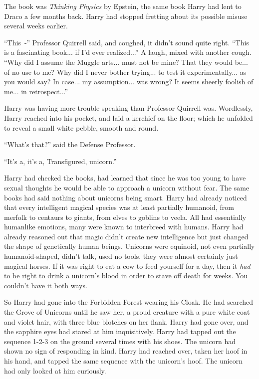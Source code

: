 The book was \emph{Thinking Physics} by Epstein, the same book Harry had lent to Draco a few months back. Harry had stopped fretting about its possible misuse several weeks earlier.

``This~-'' Professor Quirrell said, and coughed, it didn't sound quite right. ``This is a fascinating book... if I'd ever realized...'' A laugh, mixed with another cough. ``Why did I assume the Muggle arts... must not be mine? That they would be... of no use to me? Why did I never bother trying... to test it experimentally... as you would say? In case... my assumption... was wrong? It seems sheerly foolish of me... in retrospect...''

Harry was having more trouble speaking than Professor Quirrell was. Wordlessly, Harry reached into his pocket, and laid a kerchief on the floor; which he unfolded to reveal a small white pebble, smooth and round.

``What's that?'' said the Defense Professor.

``It's a, it's a, Transfigured, unicorn.''

Harry had checked the books, had learned that since he was too young to have sexual thoughts he would be able to approach a unicorn without fear. The same books had said nothing about unicorns being smart. Harry had already noticed that every intelligent magical species was at least partially humanoid, from merfolk to centaurs to giants, from elves to goblins to veela. All had essentially humanlike emotions, many were known to interbreed with humans. Harry had already reasoned out that magic didn't create new intelligence but just changed the shape of genetically human beings. Unicorns were equinoid, not even partially humanoid-shaped, didn't talk, used no tools, they were almost certainly just magical horses. If it was right to eat a cow to feed yourself for a day, then it \emph{had} to be right to drink a unicorn's blood in order to stave off death for weeks. You couldn't have it both ways.

So Harry had gone into the Forbidden Forest wearing his Cloak. He had searched the Grove of Unicorns until he saw her, a proud creature with a pure white coat and violet hair, with three blue blotches on her flank. Harry had gone over, and the sapphire eyes had stared at him inquisitively. Harry had tapped out the sequence 1-2-3 on the ground several times with his shoes. The unicorn had shown no sign of responding in kind. Harry had reached over, taken her hoof in his hand, and tapped the same sequence with the unicorn's hoof. The unicorn had only looked at him curiously.

